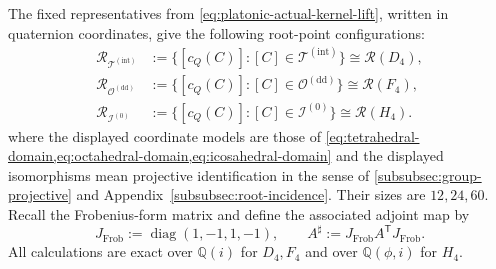 \documentclass[11pt,letterpaper,onecolumn]{article}
\theoremstyle{plain}
\theoremstyle{definition}
\theoremstyle{remark}
\newcommand{\TetInt}{{\mathcal T^{(\mathrm{int})}}}
\newcommand{\OctDD}{{\mathcal O^{(\mathrm{dd})}}}
\newcommand{\IcoZero}{{\mathcal I^{(0)}}}
\newcommand{\diag}{\operatorname{diag}}
\begin{document}
The fixed representatives from \cref{eq:platonic-actual-kernel-lift},
written in quaternion coordinates, give the following root-point configurations:
\[
\begin{aligned}
 \mathcal R_{\TetInt}&:=\{[c_Q(C)]:[C]\in\TetInt\}
    \cong\mathcal R(D_4),\\
 \mathcal R_{\OctDD}&:=\{[c_Q(C)]:[C]\in\OctDD\}
    \cong\mathcal R(F_4),\\
 \mathcal R_{\IcoZero}&:=\{[c_Q(C)]:[C]\in\IcoZero\}
    \cong\mathcal R(H_4).
\end{aligned}
\]
where the displayed coordinate models are those of
\cref{eq:tetrahedral-domain,eq:octahedral-domain,eq:icosahedral-domain}
and the displayed isomorphisms mean projective identification in the sense of
\cref{subsubsec:group-projective} and Appendix~\ref{subsubsec:root-incidence}.  Their sizes are
\(12,24,60\).    Recall the Frobenius-form
matrix and define the associated
adjoint map by
\[
  J_{\mathrm{Frob}}:=\diag(1,-1,1,-1),
  \qquad A^\sharp:=J_{\mathrm{Frob}}A^{\mathsf T}J_{\mathrm{Frob}}.
\]
All calculations are exact over \(\mathbb Q(i)\) for \(D_4,F_4\) and
over \(\mathbb Q(\phi,i)\) for \(H_4\).
\end{document}
